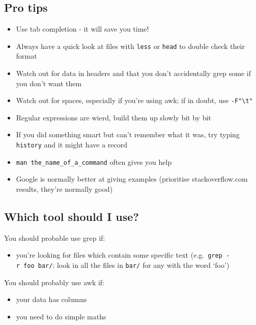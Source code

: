 \documentclass[11pt]{article}
\providecommand{\tightlist}{%
      \setlength{\itemsep}{0pt}\setlength{\parskip}{0pt}}
\begin{document}
\hypertarget{pro-tips}{%
\subsection{Pro tips}\label{pro-tips}}

\begin{itemize}
\tightlist
\item
  Use tab completion - it will save you time!
\item
  Always have a quick look at files with \texttt{less} or \texttt{head}
  to double check their format
\item
  Watch out for data in headers and that you don't accidentally grep
  some if you don't want them
\item
  Watch out for spaces, especially if you're using awk; if in doubt, use
  \texttt{-F"\textbackslash{}t"}
\item
  Regular expressions are wierd, build them up slowly bit by bit
\item
  If you did something smart but can't remember what it was, try typing
  \texttt{history} and it might have a record
\item
  \texttt{man\ the\_name\_of\_a\_command} often gives you help
\item
  Google is normally better at giving examples (prioritise
  stackoverflow.com results, they're normally good)
\end{itemize}

\hypertarget{which-tool-should-i-use}{%
\subsection{Which tool should I use?}\label{which-tool-should-i-use}}

You should probable use grep if:

\begin{itemize}
\tightlist
\item
  you're looking for files which contain some specific text
  (e.g.~\texttt{grep\ -r\ foo\ bar/}: look in all the files in
  \texttt{bar/} for any with the word `foo')
\end{itemize}

You should probably use awk if:

\begin{itemize}
\tightlist
\item
  your data has columns
\item
  you need to do simple maths
\end{itemize}
\end{document}
